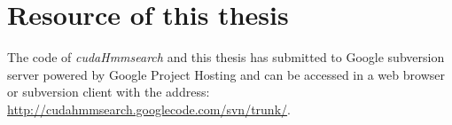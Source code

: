 
\chapter{Resource of this thesis} %

\label{AppendixA} %


The code of \emph{cudaHmmsearch} and this thesis has submitted to Google subversion server powered by Google Project Hosting and can be accessed in a web browser or subversion client with the address:
\url{http://cudahmmsearch.googlecode.com/svn/trunk/}.

